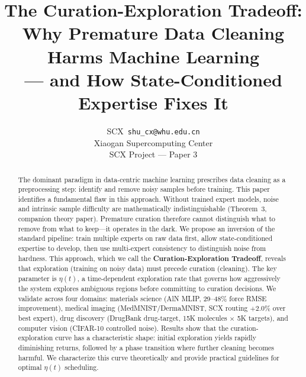 \documentclass{article}
\begin{document}
\title{The Curation-Exploration Tradeoff: \\
Why Premature Data Cleaning Harms Machine Learning \\
--- and How State-Conditioned Expertise Fixes It}

\author{SCX\ \texttt{shu\_cx@whu.edu.cn} \\
Xiaogan Supercomputing Center \\
SCX Project --- Paper 3}

\maketitle

\begin{abstract}

The dominant paradigm in data-centric machine learning prescribes data cleaning as a preprocessing step: identify and remove noisy samples before training. This paper identifies a fundamental flaw in this approach. Without trained expert models, noise and intrinsic sample difficulty are mathematically indistinguishable (Theorem~3, companion theory paper). Premature curation therefore cannot distinguish what to remove from what to keep---it operates in the dark. We propose an inversion of the standard pipeline: train multiple experts on raw data first, allow state-conditioned expertise to develop, then use multi-expert consistency to distinguish noise from hardness. This approach, which we call the \textbf{Curation-Exploration Tradeoff}, reveals that exploration (training on noisy data) must precede curation (cleaning). The key parameter is $\eta(t)$, a time-dependent exploration rate that governs how aggressively the system explores ambiguous regions before committing to curation decisions. We validate across four domains: materials science (AlN MLIP, 29--48\% force RMSE improvement), medical imaging (MedMNIST/DermaMNIST, SCX routing $+2.0\%$ over best expert), drug discovery (DrugBank drug-target, 15K molecules $\times$ 5K targets), and computer vision (CIFAR-10 controlled noise). Results show that the curation-exploration curve has a characteristic shape: initial exploration yields rapidly diminishing returns, followed by a phase transition where further cleaning becomes harmful. We characterize this curve theoretically and provide practical guidelines for optimal $\eta(t)$ scheduling.

\end{abstract}
\end{document}

